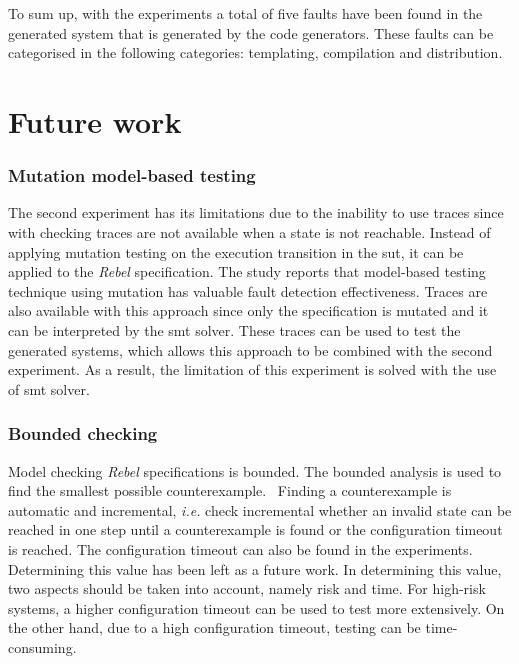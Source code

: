 To sum up, with the experiments a total of five faults have been found in the
generated system that is generated by the code generators.
These faults can be categorised in the following categories: templating,
compilation and distribution.

\clearpage

\section{Future work}

\subsubsection{Mutation model-based testing}

The second experiment has its limitations due to the inability to use traces
since with checking traces are not available when a state is not reachable.
Instead of applying mutation testing on the execution transition in the
\gls{sut}, it can be applied to the \textit{Rebel} specification.
The study \cite{paradkar2005case} reports that model-based testing technique
using mutation has valuable fault detection effectiveness.
Traces are also available with this approach since only the specification is
mutated and it can be interpreted by the \gls{smt} solver.
These traces can be used to test the generated systems, which allows this
approach to be combined with the second experiment. As a result, the limitation
of this experiment is solved with the use of \gls{smt} solver.

\subsubsection{Bounded checking}
Model checking \textit{Rebel} specifications is bounded. The bounded analysis is
used to find the smallest possible counterexample.~\cite[p.~5]{stoel_storm_vinju_bosman_2016}
Finding a counterexample is automatic and incremental,
\textit{i.e.} check incremental whether an invalid state can be reached in one
step until a counterexample is found or the configuration timeout is reached.
The configuration timeout can also be found in the experiments.
Determining this value has been left as a future work.
In determining this value, two aspects should be taken into account,
namely risk and time. For high-risk systems, a higher configuration timeout can
be used to test more extensively. On the other hand, due to a high configuration
timeout, testing can be time-consuming.

